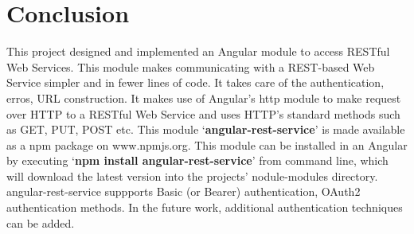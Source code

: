 \chapter{Conclusion}
\pagestyle{fancy}
\fancyhead[LO]{\itshape\nouppercase{\rightmark}}

\hspace{0.2in} This project designed and implemented an Angular module to access RESTful Web Services. This module makes communicating with a REST-based Web Service simpler and in fewer lines of code. It takes care of the authentication, erros, URL construction.  It makes use of Angular's http module to make request over HTTP to a RESTful Web Service and uses HTTP's standard methods such as GET, PUT, POST etc. This module `\textbf{angular-rest-service}' is made available as a npm package on www.npmjs.org. This module can be installed in an Angular by executing `\textbf{npm install angular-rest-service}' from command line, which will download the latest version into the projects' nodule-modules directory. angular-rest-service suppports Basic (or Bearer) authentication, OAuth2 authentication methods. In the future work, additional authentication techniques can be added. 
